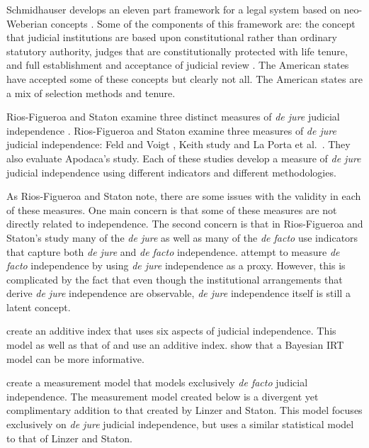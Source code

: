 \documentclass[12pt]{article}
\begin{document}
Schmidhauser develops an eleven part framework for a legal system based on neo-Weberian concepts \citep{Schmidhauser1987}.  Some of the components of this framework are: the concept that judicial institutions are based upon constitutional rather than ordinary statutory authority,  judges that are constitutionally protected with life tenure, and full establishment and acceptance of judicial review \cite[46-47]{Schmidhauser1987}.  The American states have accepted some of these concepts but clearly not all.  The American states are a mix of selection methods and tenure.

Rios-Figueroa and Staton examine three distinct measures of \textit{de jure} judicial independence \citep{Rios2014}.  Rios-Figueroa and Staton examine three measures of \textit{de jure} judicial independence: Feld and Voigt \citeyearpar{Feld2003}, Keith \citeyearpar{Keith2002a} study and La Porta et al.\ \citeyearpar{Laporta2004}.  They also evaluate Apodaca's \citeyearpar{Apodaca2004} study.  Each of these studies develop a measure of \textit{de jure} judicial independence using different indicators and different methodologies.

As Rios-Figueroa and Staton note, there are some issues with the validity in each of these measures.  One main concern is that some of these measures are not directly related to independence.  The second concern is that in Rios-Figueroa and Staton's study many of the \textit{de jure} as well as many of the \textit{de facto} use indicators that capture both \textit{de jure} and \textit{de facto} independence.  \citet*{Laporta2004} attempt to measure \textit{de facto} independence by using \textit{de jure} independence as a proxy.  However, this is complicated by the fact that even though the institutional arrangements that derive \textit{de jure} independence are observable, \textit{de jure} independence itself is still a latent concept. 

\citet*{Melton2014} create an additive index that uses six aspects of judicial independence.  This model as well as that of \citet*{Voigt2007} and \citet*{Keith2002b} use an additive index.  \citet*{Linzer2014} show that a Bayesian IRT model can be more informative.

\citet*{Linzer2014} create a measurement model that models exclusively \textit{de facto} judicial independence.  The measurement model created below is a divergent yet complimentary addition to that created by Linzer and Staton.  This model focuses exclusively on \textit{de jure} judicial independence, but uses a similar statistical model to that of Linzer and Staton.  
\end{document}
